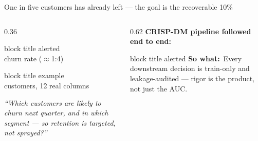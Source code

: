\documentclass[11pt,aspectratio=169]{beamer}
\newcommand{\sowhat}[1]{%
  \vspace{2pt}\begin{beamercolorbox}[wd=\textwidth,sep=4pt,rounded=true]{block title alerted}%
  \footnotesize\textbf{So what:}~#1\end{beamercolorbox}}
\begin{document}
\begin{frame}{One in five customers has already left --- the goal is the recoverable 10\%}
  \begin{columns}[T]
    \begin{column}{0.36\textwidth}
      \centering
      \begin{beamercolorbox}[wd=\textwidth,sep=8pt,rounded=true]{block title alerted}
        \\[2pt]{\footnotesize churn rate (\(\approx\)1:4)}
      \end{beamercolorbox}\vspace{6pt}
      \begin{beamercolorbox}[wd=\textwidth,sep=8pt,rounded=true]{block title example}
        \\[2pt]{\footnotesize customers, 12 real columns}
      \end{beamercolorbox}\vspace{6pt}
      \footnotesize\textit{``Which customers are likely to churn next quarter, and in which segment --- so retention is targeted, not sprayed?''}
    \end{column}
    \begin{column}{0.62\textwidth}
      \small\textbf{CRISP-DM pipeline followed end to end:}\\[8pt]
      \begin{center}
      \end{center}
      \vspace{2pt}
      \sowhat{Every downstream decision is train-only and leakage-audited --- rigor is the product, not just the AUC.}
    \end{column}
  \end{columns}
\end{frame}
\end{document}
